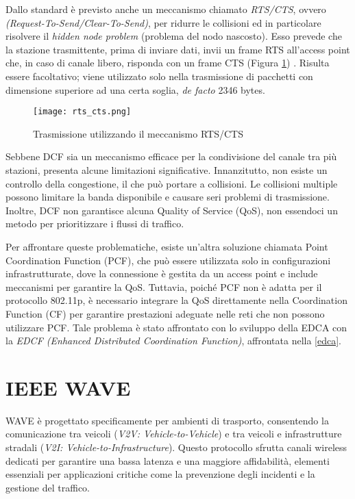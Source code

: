 Dallo standard è previsto anche un meccanismo chiamato \textit{RTS/CTS}, ovvero \textit{(Request-To-Send/Clear-To-Send)}, per ridurre le collisioni ed in particolare risolvere il \textit{hidden node problem} (problema del nodo nascosto). Esso prevede che la stazione trasmittente, prima di inviare dati, invii un frame RTS all'access point che, in caso di canale libero, risponda con un frame CTS (Figura \ref{fig:rts_cts}) \cite{rts}. Risulta essere facoltativo; viene utilizzato solo nella trasmissione di pacchetti con dimensione superiore ad una certa soglia, \textit{de facto} 2346 bytes.

\begin{figure}[h!]
    \centering
    \texttt{[image: rts\_cts.png]}
    \caption{Trasmissione utilizzando il meccanismo RTS/CTS}
    \label{fig:rts_cts}
\end{figure}

Sebbene DCF sia un meccanismo efficace per la condivisione del canale tra più stazioni, presenta alcune limitazioni significative. Innanzitutto, non esiste un controllo della congestione, il che può portare a collisioni. Le collisioni multiple possono limitare la banda disponibile e causare seri problemi di trasmissione. Inoltre, DCF non garantisce alcuna Quality of Service (QoS), non essendoci un metodo per prioritizzare i flussi di traffico.

Per affrontare queste problematiche, esiste un'altra soluzione chiamata Point Coordination Function (PCF), che può essere utilizzata solo in configurazioni infrastrutturate, dove la connessione è gestita da un access point e include meccanismi per garantire la QoS. Tuttavia, poiché PCF non è adatta per il protocollo 802.11p, è necessario integrare la QoS direttamente nella Coordination Function (CF) per garantire prestazioni adeguate nelle reti che non possono utilizzare PCF. Tale problema è stato affrontato con lo sviluppo della EDCA con la \textit{EDCF (Enhanced Distributed Coordination Function)}, affrontata nella \autoref{edca}.

\section{IEEE WAVE}
\label{wave}
WAVE è progettato specificamente per ambienti di trasporto, consentendo la comunicazione tra veicoli (\textit{V2V: Vehicle-to-Vehicle}) e tra veicoli e infrastrutture stradali (\textit{V2I: Vehicle-to-Infrastructure}). Questo protocollo sfrutta canali wireless dedicati per garantire una bassa latenza e una maggiore affidabilità, elementi essenziali per applicazioni critiche come la prevenzione degli incidenti e la gestione del traffico. 


